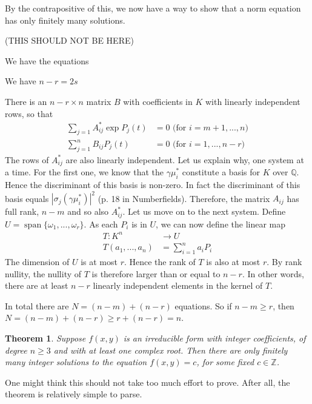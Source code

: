 \documentclass{article}
\newcommand{\Span}{\operatorname{span}}
\newtheorem{theorem}{Theorem}[section]
\newcommand{\mbb}[1]{\mathbb{#1}}
\begin{document}
By the contrapositive of this, we now have a way to show that a norm equation has only finitely many solutions. 


(THIS SHOULD NOT BE HERE)

We have the equations

We have $n - r = 2s$

There is an $n-r \times n$ matrix $B$ with coefficients in $K$ with linearly independent rows, so that
\begin{align*}
    \sum_{j=1} A^*_{ij}\exp P_j(t) &= 0 \text{ (for } i = m+1, ..., n) \\
    \sum_{j=1}^n B_{ij}P_j(t) &= 0 \text{ (for } i = 1,  ..., n-r)
\end{align*}
The rows of $A^*_{ij}$ are also linearly independent. Let us explain why, one system at a time. For the first one, we know that the $\gamma \mu_i^*$ constitute a basis for $K$ over $\mbb{Q}$. Hence the discriminant of this basis is non-zero. In fact the discriminant of this basis equals $|\sigma_j(\gamma \mu_i^*)|^2$ (p. 18 in Numberfields). Therefore, the matrix $A_{ij}$ has full rank, $n-m$ and so also $A_{ij}^*$. Let us move on to the next system. Define $U = \Span \{ \omega_1, ..., \omega_r \}$. As each $P_i$ is in $U$, we can now define the linear map
\begin{align*}
    T : K^n &\to U \\
    T(a_1, ..., a_n) &= \sum_{i = 1}^n a_i P_i
\end{align*}
The dimension of $U$ is at most $r$. Hence the rank of $T$ is also at most $r$. By rank nullity, the nullity of $T$ is therefore larger than or equal to $n-r$. In other words, there are at least $n-r$ linearly independent elements in the kernel of $T$.


In total there are $N = (n - m) + (n - r)$ equations. So if $n - m \geq r$, then $N = (n - m) + (n - r) \geq r + (n - r) = n$. 








\begin{theorem}
    Suppose $f(x,y)$ is an irreducible form with integer coefficients, of degree $n \geq 3$ and with at least one complex root. Then there are only finitely many integer solutions to the equation $f(x,y) = c$, for some fixed $c \in \mbb{Z}$.
\end{theorem}
One might think this should not take too much effort to prove. After all, the theorem is relatively simple to parse.
\end{document}
